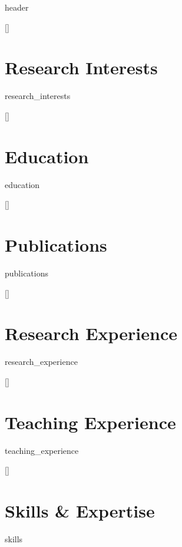\documentclass[11pt,a4paper]{article}
\newcommand{\resumeSection}[1]{
  \vspace{-2pt}
  \titleformat{\section}{\Large\bfseries\raggedright}{}{0em}{}[\titlerule]
  \section{#1}
  \vspace{-8pt}
}
\begin{document}
{{header}}

\resumeSection{Research Interests}
{{research_interests}}

\resumeSection{Education}
{{education}}

\resumeSection{Publications}
{{publications}}

\resumeSection{Research Experience}
{{research_experience}}

\resumeSection{Teaching Experience}
{{teaching_experience}}

\resumeSection{Skills \& Expertise}
{{skills}}
\end{document}

